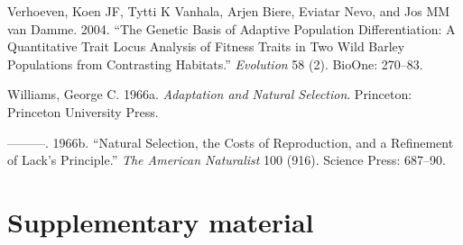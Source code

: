 \documentclass[]{article}
\begin{document}
\leavevmode\hypertarget{ref-Verhoeven2004}{}%
Verhoeven, Koen JF, Tytti K Vanhala, Arjen Biere, Eviatar Nevo, and Jos MM van Damme. 2004. ``The Genetic Basis of Adaptive Population Differentiation: A Quantitative Trait Locus Analysis of Fitness Traits in Two Wild Barley Populations from Contrasting Habitats.'' \emph{Evolution} 58 (2). BioOne: 270--83.

\leavevmode\hypertarget{ref-Williams1966}{}%
Williams, George C. 1966a. \emph{Adaptation and Natural Selection}. Princeton: Princeton University Press.

\leavevmode\hypertarget{ref-Williams1966a}{}%
---------. 1966b. ``Natural Selection, the Costs of Reproduction, and a Refinement of Lack's Principle.'' \emph{The American Naturalist} 100 (916). Science Press: 687--90.

\hypertarget{supplementary-material}{%
\section*{Supplementary material}\label{supplementary-material}}

\setcounter{table}{0}  \renewcommand{\thetable}{S\arabic{table}} \setcounter{figure}{0} \renewcommand{\thefigure}{S\arabic{figure}}
\end{document}
